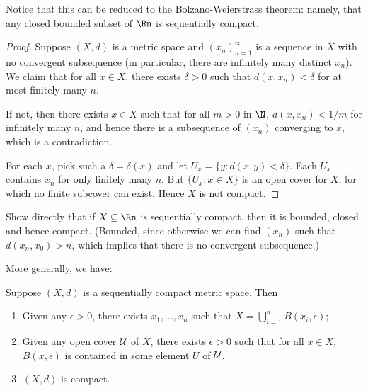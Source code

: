 \vspace{-6pt}

Notice that this can be reduced to the Bolzano-Weierstrass theorem: namely, that any closed bounded subset of $\Rn$ is sequentially compact.

\begin{proof}
	Suppose $(X,d)$ is a metric space and $(x_n)_{n=1}^\infty$ is a sequence in $X$ with no convergent subsequence (in particular, there are infinitely many distinct $x_n$). We claim that for all $x\in X$, there exists $\delta>0$ such that $d(x,x_n) < \delta$ for at most finitely many $n$.

	If not, then there exists $x\in X$ such that for all $m>0$ in $\N$, $d(x,x_n)<1/m$ for infinitely many $n$, and hence there is a subsequence of $(x_n)$ converging to $x$, which is a contradiction.

	For each $x$, pick such a $\delta=\delta(x)$ and let $U_x = \{y:d(x,y) < \delta\}$. Each $U_x$ contains $x_n$ for only finitely many $n$. But $\{U_x:x\in X\}$ is an open cover for $X$, for which no finite subcover can exist. Hence $X$ is not compact.
\end{proof}

\begin{exercise}
	Show directly that if $X\subseteq\Rn$ is sequentially compact, then it is bounded, closed and hence compact. (Bounded, since otherwise we can find $(x_n)$ such that $d(x_n,x_0) > n$, which implies that there is no convergent subsequence.)
\end{exercise}

More generally, we have:

\begin{theorem}
	Suppose $(X,d)$ is a sequentially compact metric space. Then
	\begin{enumerate}
		\shortskip
		\item Given any $\epsilon>0$, there exists $x_1,\ldots,x_n$ such that $X=\bigcup_{i=1}^n B(x_i,\epsilon)$;
		\item Given any open cover $\cal{U}$ of $X$, there exists $\epsilon>0$ such that for all $x\in X$, $B(x,\epsilon)$ is contained in some element $U$ of $\cal{U}$.
		\item $(X,d)$ is compact.
	\end{enumerate}
\end{theorem}

